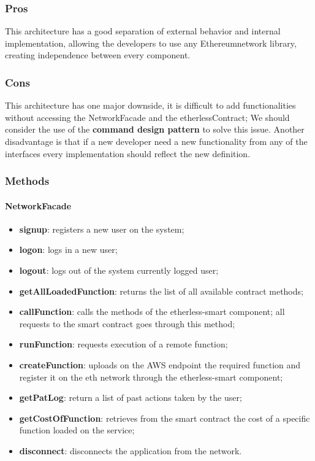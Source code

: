 \subsubsection{Pros}
This architecture has a good separation of external behavior and internal implementation,
allowing the developers to use any Ethereum\glo network library, creating independence between every component.
\subsubsection{Cons}
This architecture has one major downside, it is difficult to add functionalities without accessing the NetworkFacade and the etherlessContract; We should consider the use of the \textbf{command design pattern} to solve this issue.
Another disadvantage is that if a new developer need a new functionality from any of the interfaces every implementation should reflect the new definition.
\subsubsection{Methods}
\paragraph{NetworkFacade}
\begin{itemize}
    \item \textbf{signup}: registers a new user on the system;
    \item \textbf{logon}: logs in a new user; 
    \item \textbf{logout}: logs out of the system currently logged user;
	\item \textbf{getAllLoadedFunction}: returns the list of all available contract methods;
    \item \textbf{callFunction}: calls the methods of the etherless-smart component; all requests to the smart contract goes through this method;
    \item \textbf{runFunction}: requests execution of a remote function;
    \item \textbf{createFunction}: uploads on the AWS endpoint the required function and register it on the eth network through the etherless-smart component;
    \item \textbf{getPatLog}: return a list of past actions taken by the user;
    \item \textbf{getCostOfFunction}: retrieves from the smart contract the cost of a specific function loaded on the service;
    \item \textbf{disconnect}: disconnects the application from the network.
\end{itemize}
